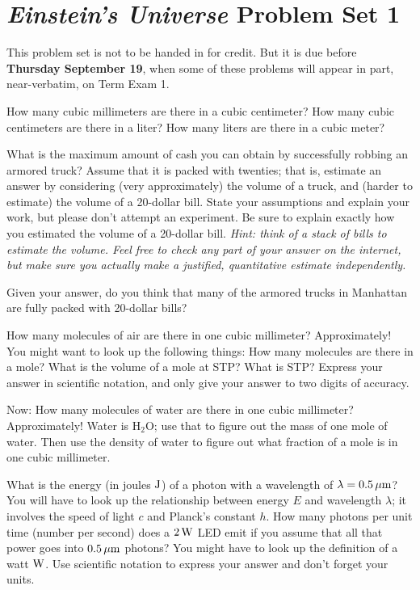 \documentclass[12pt, letterpaper]{article}
\begin{document}
\section*{\textsl{Einstein's Universe} Problem Set 1}

This problem set is not to be handed in for credit. But it is due
before \textbf{Thursday September 19}, when some of these problems
will appear in part, near-verbatim, on Term Exam 1.

\begin{problem}
How many cubic millimeters are there in a cubic centimeter? How many
cubic centimeters are there in a liter? How many liters are there in a
cubic meter?
\end{problem}

\begin{problem}
What is the maximum amount of cash you can obtain by
successfully robbing an armored truck?  Assume that it is packed with
twenties; that is, estimate an answer by considering (very approximately) the volume of a
truck, and (harder to estimate) the volume of a 20-dollar bill.  State
your assumptions and explain your work, but please don't attempt an
experiment.  Be sure to explain exactly how you estimated the volume
of a 20-dollar bill.  \emph{Hint: think of a stack of bills to
  estimate the volume.  Feel free to \emph{check} any part of your
  answer on the internet, but make sure you actually make a justified,
  quantitative estimate independently.}

Given your answer, do you think that many of the armored trucks in Manhattan
are fully packed with 20-dollar bills?
\end{problem}

\begin{problem}
How many molecules of air are there in one cubic millimeter?
Approximately! You might want to look up the following things: How
many molecules are there in a mole? What is the volume of a mole at
STP? What is STP? Express your answer in scientific notation, and only
give your answer to two digits of accuracy.

Now: How many molecules of water are there in one cubic millimeter?
Approximately! Water is $\mathrm{H}_2\mathrm{O}$; use that to figure
out the mass of one mole of water. Then use the density of water to
figure out what fraction of a mole is in one cubic millimeter.
\end{problem}

\begin{problem}
What is the energy (in joules $\mathrm{J}$) of a photon with a wavelength of
$\lambda = 0.5\,\mathrm{\mu m}$? You will have to look up the relationship
between energy $E$ and wavelength $\lambda$; it involves the speed of
light $c$ and Planck's constant $h$. How many photons per unit time
(number per second) does a $2\,\mathrm{W}$ LED emit if you assume that all
that power goes into $0.5\,\mathrm{\mu m}$ photons? You might have to look up
the definition of a watt $\mathrm{W}$. Use scientific notation to express your
answer and don't forget your units.
\end{problem}
\end{document}
